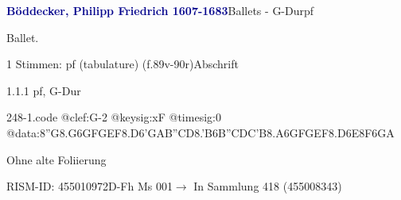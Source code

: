 \documentclass[twocolumn, 12pt]{book}
\begin{document}
\par \vspace{16pt} \textcolor{darkblue}{\textbf{Böddecker, Philipp Friedrich  1607-1683}}\hfillplus{\textbf{[248]}}\newline Ballets - G-Dur\newline pf
\par \begin{itshape}[f.89v, at left:] Ballet.\end{itshape} 
\par \textcolor{darkblue}{}  1 Stimmen: pf (tabulature)  (f.89v-90r)\newline Abschrift
\par 1.1.1  pf, G-Dur  
\begin{filecontents*}{248-1.code}
@clef:G-2
@keysig:xF
@timesig:0
@data:8''G{8.G6G}{FGEF}{8.D6'G}{AB''CD}{8.'B6B}{''CDC'B}{8.A6G}{FGEF}{8.D6E}{8F6GA}
\end{filecontents*}
\newline %
\par Ohne alte Foliierung
\par RISM-ID: 455010972\newline D-Fh  Ms 001\newline $\rightarrow$ In Sammlung 418 (455008343)
      
\end{document}
